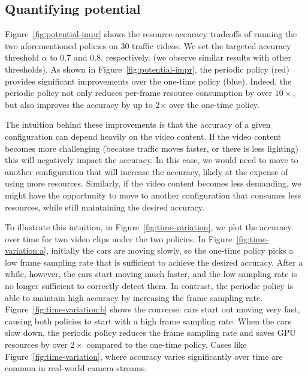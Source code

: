 \subsection{Quantifying potential}

Figure~\ref{fig:potential-impr} shows the resource-accuracy tradeoffs of running the two
aforementioned policies on 30 traffic videos. 
We set the targeted accuracy threshold $\alpha$ to $0.7$ and $0.8$, respectively. 
(we observe similar results with other thresholds). 
As shown in Figure~\ref{fig:potential-impr}, the periodic policy (red) provides significant improvements over the one-time policy (blue). Indeed, the periodic policy not only reduces per-frame resource consumption by over $10\times$, but also improves the accuracy by up to 2$\times$ over the one-time policy. 

The intuition behind these improvements is that the accuracy of a given configuration can depend heavily on the video content. If the video content becomes more challenging (\eg because traffic moves faster, or there is less lighting) this will negatively impact the accuracy. In this case, we would need to move to another configuration that will increase the accuracy, likely at the expense of using more resources. Similarly, if the video content becomes less demanding, we might have the opportunity to move to another configuration that consumes less resources, while still maintaining the desired accuracy. 


To illustrate this intuition, in Figure~\ref{fig:time-variation}, we plot the accuracy over time for two video clips under the two policies. In Figure~\ref{fig:time-variation:a}, initially the cars are moving  slowly, so the one-time policy picks a low frame sampling rate that is  sufficient to achieve the desired accuracy. After a while, however, the cars start moving much faster, and the low sampling rate is no longer sufficient to  correctly detect them. In contrast, the periodic policy is able to maintain high accuracy by increasing the frame sampling rate. Figure~\ref{fig:time-variation:b} shows the converse: cars start out moving very fast, causing both policies to start with a high frame sampling rate. When the cars slow down, the periodic policy reduces the frame sampling rate and saves GPU resources by over $2\times$ compared to the one-time policy. 
Cases like Figure~\ref{fig:time-variation}, where accuracy varies significantly over time are common in real-world camera streams. 

